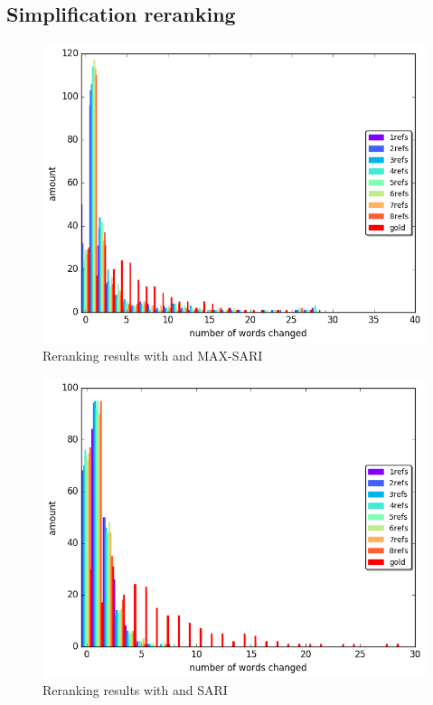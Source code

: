 \documentclass[letterpaper, 11pt]{article}
\begin{document}
\subsection{Simplification reranking}\label{ap:simp-rerank}
\begin{figure}
	\includegraphics[width=0.9\columnwidth]{nisioi_max_words_differences_hist}
	\caption{Reranking results with  and MAX-SARI}
\end{figure}
\begin{figure}
	\includegraphics[width=0.9\columnwidth]{moses_sari_words_differences_hist}
	\caption{Reranking results with  and  SARI}

\end{figure}
\end{document}
